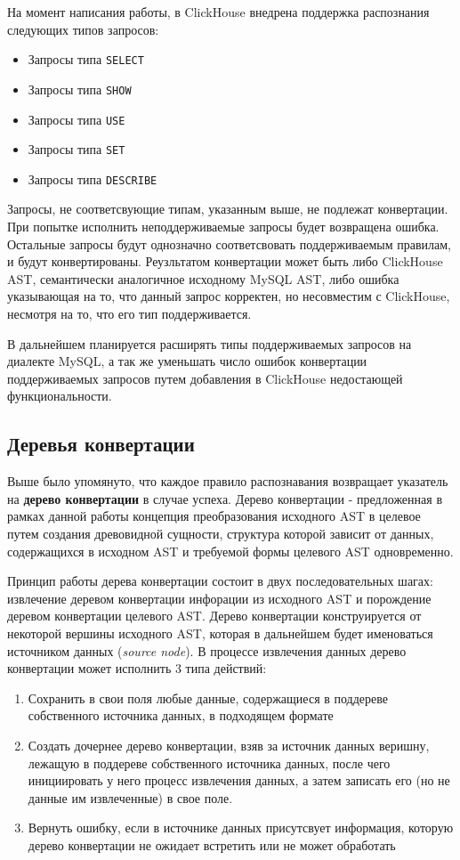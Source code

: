 На момент написания работы, в ClickHouse внедрена поддержка распознания следующих типов запросов:
\begin{itemize}
    \item Запросы типа \texttt{SELECT}
    \item Запросы типа \texttt{SHOW}
    \item Запросы типа \texttt{USE}
    \item Запросы типа \texttt{SET}
    \item Запросы типа \texttt{DESCRIBE}
\end{itemize}

Запросы, не соответсвующие типам, указанным выше, не подлежат конвертации. При попытке исполнить неподдерживаемые запросы будет возвращена ошибка. Остальные запросы будут однозначно соответсвовать поддерживаемым правилам, и будут конвертированы. Реузльтатом конвертации может быть либо ClickHouse AST, семантически аналогичное исходному MySQL AST, либо ошибка указывающая на то, что данный запрос корректен, но несовместим с ClickHouse, несмотря на то, что его тип поддерживается.

В дальнейшем планируется расширять типы поддерживаемых запросов на диалекте MySQL, а так же уменьшать число ошибок конвертации поддерживаемых запросов путем добавления в ClickHouse недостающей функциональности. 

\subsection{Деревья конвертации} \label{conv_tree}
Выше было упомянуто, что каждое правило распознавания возвращает указатель на \textbf{дерево конвертации} в случае успеха. Дерево конвертации - предложенная в рамках данной работы концепция преобразования исходного AST в целевое путем создания древовидной сущности, структура которой зависит от данных, содержащихся в исходном AST и требуемой формы целевого AST одновременно. 

Принцип работы дерева конвертации состоит в двух последовательных шагах: извлечение деревом конвертации инфорации из исходного AST и порождение деревом конвертации целевого AST. Дерево конвертации конструируется от некоторой вершины исходного AST, которая в дальнейшем будет именоваться источником данных (\textit{source node}). В процессе извлечения данных дерево конвертации может исполнить 3 типа действий:

\begin{enumerate}
    \item Сохранить в свои поля любые данные, содержащиеся в поддереве собственного источника данных, в подходящем формате
    \item Создать дочернее дерево конвертации, взяв за источник данных веришну, лежащую в поддереве собственного источника данных, после чего инициировать у него процесс извлечения данных, а затем записать его (но не данные им извлеченные) в свое поле. 
    \item Вернуть ошибку, если в источнике данных присутсвует информация, которую дерево конвертации не ожидает встретить или не может обработать
\end{enumerate}

